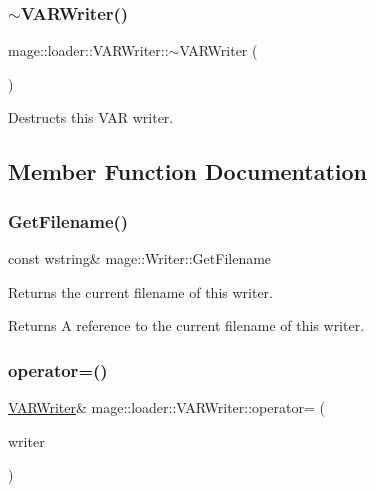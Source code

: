 \subsubsection{\texorpdfstring{$\sim$\+V\+A\+R\+Writer()}{~VARWriter()}}
{\footnotesize\ttfamily mage\+::loader\+::\+V\+A\+R\+Writer\+::$\sim$\+V\+A\+R\+Writer (\begin{DoxyParamCaption}{ }\end{DoxyParamCaption})\hspace{0.3cm}{\ttfamily [default]}}

Destructs this V\+AR writer. 

\subsection{Member Function Documentation}
\mbox{\label{classmage_1_1loader_1_1_v_a_r_writer_aedbc8d5fa02444ecba2e040ca8e98281}} 
\subsubsection{\texorpdfstring{Get\+Filename()}{GetFilename()}}
{\footnotesize\ttfamily const wstring\& mage\+::\+Writer\+::\+Get\+Filename\hspace{0.3cm}{\ttfamily [noexcept]}}

Returns the current filename of this writer.

\begin{DoxyReturn}{Returns}
A reference to the current filename of this writer. 
\end{DoxyReturn}
\mbox{\label{classmage_1_1loader_1_1_v_a_r_writer_a6ffe21455dfc82f8d829d9cabe59ba53}} 
\subsubsection{\texorpdfstring{operator=()}{operator=()}\hspace{0.1cm}{\footnotesize\ttfamily [1/2]}}
{\footnotesize\ttfamily \mbox{\hyperlink{classmage_1_1loader_1_1_v_a_r_writer}{V\+A\+R\+Writer}}\& mage\+::loader\+::\+V\+A\+R\+Writer\+::operator= (\begin{DoxyParamCaption}\item[{const \mbox{\hyperlink{classmage_1_1loader_1_1_v_a_r_writer}{V\+A\+R\+Writer}} \&}]{writer }\end{DoxyParamCaption})\hspace{0.3cm}{\ttfamily [delete]}}

